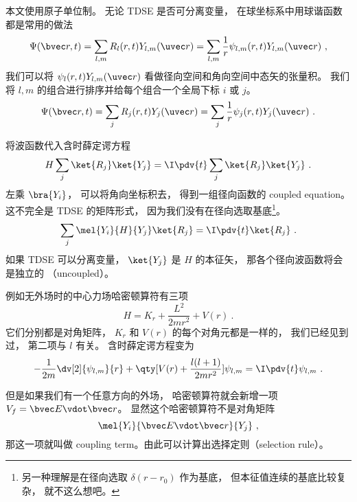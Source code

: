
\begin{issues}
\issueAbstract
{}
\end{issues}


本文使用原子单位制。 无论 TDSE 是否可分离变量， 在球坐标系中用球谐函数都是常用的做法
\begin{equation}\label{eq_RYTDSE_1}
\Psi(\bvec r, t) = \sum_{l,m} R_l (r, t) Y_{l,m} (\uvec r) = \sum_{l,m} \frac{1}{r} \psi_{l,m} (r, t) Y_{l,m} (\uvec r)~,
\end{equation}
我们可以将 $\psi_l (r, t) Y_{l,m} (\uvec r)$ 看做径向空间和角向空间中态矢的张量积。 我们将 $l, m$ 的组合进行排序并给每个组合一个全局下标 $i$ 或 $j$。
\begin{equation}
\Psi(\bvec r, t) = \sum_j R_j (r, t) Y_j (\uvec r) = \sum_j \frac{1}{r} \psi_j (r, t) Y_j (\uvec r)~.
\end{equation}

将波函数代入含时薛定谔方程
\begin{equation}
H \sum_j\ket{R_j}\ket{Y_j} = \I \pdv{t}  \sum_j\ket{R_j}\ket{Y_j}~.
\end{equation}
左乘 $\bra{Y_i}$， 可以将角向坐标积去， 得到一组径向函数的 coupled equation。 这不完全是 TDSE 的矩阵形式， 因为我们没有在径向选取基底\footnote{另一种理解是在径向选取 $\delta(r - r_0)$ 作为基底， 但本征值连续的基底比较复杂， 就不这么想吧。}。
\begin{equation}
\sum_j \mel{Y_i}{H}{Y_j} \ket{R_j} = \I \pdv{t} \ket{R_j}~.
\end{equation}
如果 TDSE 可以分离变量， $\ket{Y_j}$ 是 $H$ 的本征矢， 那各个径向波函数将会是独立的 （uncoupled）。

例如无外场时的中心力场哈密顿算符有三项
\begin{equation}
H = K_r + \frac{L^2}{2mr^2} + V(r)~.
\end{equation}
它们分别都是对角矩阵， $K_r$ 和 $V(r)$ 的每个对角元都是一样的， 我们已经见到过， 第二项与 $l$ 有关。 含时薛定谔方程变为
\begin{equation}
-\frac{1}{2m} \dv[2]{\psi_{l,m}}{r} + \qty[V(r) + \frac{l(l + 1)}{2mr^2}]\psi_{l,m} = \I \pdv{t} \psi_{l,m}~.
\end{equation}

但是如果我们有一个任意方向的外场， 哈密顿算符就会新增一项 $V_f = \bvec E \vdot \bvec r$。 显然这个哈密顿算符不是对角矩阵
\begin{equation}
\mel{Y_i}{\bvec E \vdot \bvec r}{Y_j}~,
\end{equation}
那这一项就叫做 coupling term。由此可以计算出选择定则（selection rule）。
